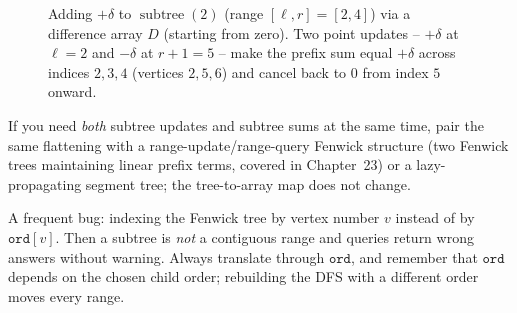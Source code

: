 \begin{figure}[htbp]
\centering
{}
\caption{Adding $+\delta$ to $\operatorname{subtree}(2)$ (range $[\ell,r]=[2,4]$) via a difference array $D$ (starting from zero). Two point updates -- $+\delta$ at $\ell=2$ and $-\delta$ at $r+1=5$ -- make the prefix sum equal $+\delta$ across indices $2,3,4$ (vertices $2,5,6$) and cancel back to $0$ from index $5$ onward.}
\label{ch21:fig-diff-subtree}
\end{figure}

If you need \emph{both} subtree updates and subtree sums at the same time, pair the same flattening with a
range-update/range-query Fenwick structure (two Fenwick trees maintaining linear prefix terms, covered in Chapter~23) or a lazy-propagating segment tree; the tree-to-array map does not change.

\begin{trapbox}
A frequent bug: indexing the Fenwick tree by vertex number $v$ instead of by
$\texttt{ord}[v]$. Then a subtree is \emph{not} a contiguous range and queries return wrong answers without warning. Always translate through $\texttt{ord}$, and remember that
$\texttt{ord}$ depends on the chosen child order; rebuilding the DFS with a
different order moves every range.
\end{trapbox}

